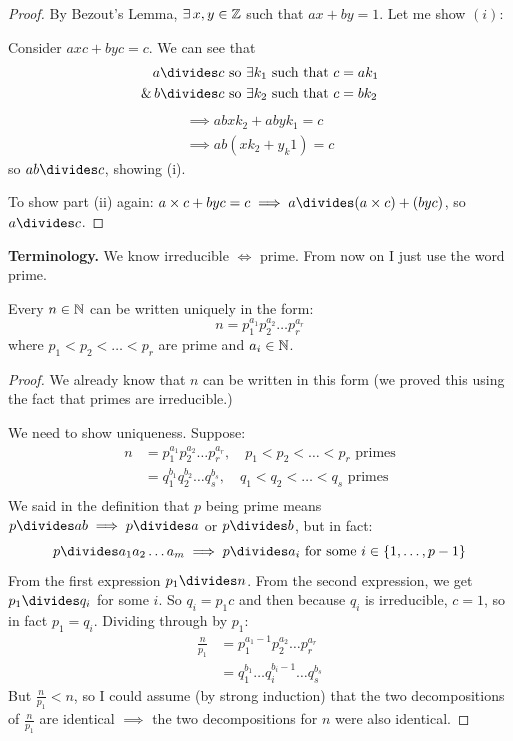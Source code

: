\documentclass[10pt]{scrartcl}
\begin{document}
\begin{proof}
By Bezout's Lemma, $\exists \, x,y \in\mathbb{Z}$ such that $ax + by = 1$. Let me show $(i)$:

Consider $axc + byc = c$. We can see that 
\[
\begin{aligned}
  a \divides c &\text{ so } \exists k_1 \text{ such that } c = ak_1\\
 \&\, b \divides c &\text{ so } \exists k_2 \text{ such that }  c = bk_2\\
\end{aligned}
\]
\[
\begin{aligned}
  \implies abxk_2 + abyk_1= c\\
  \implies ab(xk_2 + y_k1) = c
\end{aligned}
\]
so $ab \divides c$, showing (i). 

To show part (ii) again: $a \times c + byc = c \implies a \divides (a\times c) + (byc)$, so $a \divides c$.
\end{proof}\vsp

\textbf{Terminology.} We know irreducible $\iff$ prime. From now on I just use the word prime.\\

\begin{theorem}
	Every $n \in\mathbb{N}$ can be written uniquely in the form:
	\[n = p_1^{a_1}p_2^{a_2}\dots p_r^{a_r}\]
	where $p_1 < p_2 < \dots < p_r$ are prime and $a_i \in \mathbb{N}$. 
\end{theorem}

\begin{proof}
We already know that $n$ can be written in this form (we proved this using the fact that primes are irreducible.) 

We need to show uniqueness. Suppose: 
\[
\begin{aligned}
  n &= p_1^{a_1}p_2^{a_2}\dots p_r^{a_r}, \quad p_1<p_2<\dots < p_r \text{ primes}\\
  &= q_1^{b_1}q_2^{b_2}\dots q_s^{b_s}, \quad q_1<q_2<\dots < q_s \text{ primes}\\
\end{aligned}
\]
We said in the definition that $p$ being prime means $p \divides ab \implies p \divides a$ or $p \divides b$, but in fact: 
\[p \divides a_1a_2\dots a_m \implies p \divides a_i \text{ for some }i \in \{1,\dots,p-1\}\]
From the first expression $p_1 \divides n$. From the second expression, we get $p_1 \divides q_i$ for some $i$. So $q_i = p_1c$ and then because $q_i$ is irreducible, $c = 1$, so in fact $p_1 = q_i$. Dividing through by $p_1$:
\[
\begin{aligned}
  \frac{n}{p_1} &= p_1^{a_1 -1}p_2^{a_2}\dots p_r^{a_r}\\
  &= q_1^{b_1} \dots q_i^{b_i -1}\dots q_s^{b_s}
\end{aligned}
\]
But $\frac{n}{p_1} < n$, so I could assume (by strong induction) that the two decompositions of $\frac{n}{p_1}$ are identical $\implies$ the two decompositions for $n$ were also identical. 
\end{proof}\vsp
\end{document}
